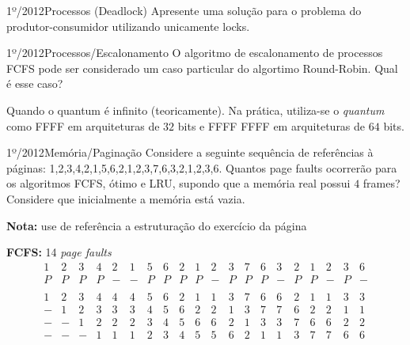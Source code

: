 \begin{exercicio}
  {1º/2012}{Processos (Deadlock)}
  {Apresente uma solução para o problema do produtor-consumidor utilizando unicamente locks.}
\end{exercicio}

\begin{exercicio}
  {1º/2012}{Processos/Escalonamento}
  {O algoritmo de escalonamento de processos FCFS pode ser considerado um caso particular do algortimo Round-Robin. Qual é esse caso?}

  Quando o quantum é infinito (teoricamente). Na prática, utiliza-se o \textit{quantum} como FFFF em arquiteturas de $32$ bits e FFFF FFFF em arquiteturas de $64$ bits.
\end{exercicio}

\begin{exercicio}
  {1º/2012}{Memória/Paginação}
  {Considere a seguinte sequência de referências à páginas:
  1,2,3,4,2,1,5,6,2,1,2,3,7,6,3,2,1,2,3,6. \newline
  Quantos page faults ocorrerão para os algoritmos FCFS, ótimo e LRU, supondo que a memória real possui $4$ frames? Considere que inicialmente a memória está vazia.}

  \textbf{Nota:} use de referência a estruturação do exercício da página \pageref{ex:pagination-1}

  \textbf{FCFS:} 14 \textit{page faults} \\
  \[
  \begin{array}{cccccccccccccccccccc}
1 & 2 & 3 & 4 & 2 & 1 & 5 & 6 & 2 & 1 & 2 & 3 & 7 & 6 & 3 & 2 & 1 & 2 & 3 & 6 \\ \hline
P & P & P & P & - & - & P & P & P & P & - & P & P & P & - & P & P & - & P & - \\
\\
1 & 2 & 3 & 4 & 4 & 4 & 5 & 6 & 2 & 1 & 1 & 3 & 7 & 6 & 6 & 2 & 1 & 1 & 3 & 3 \\
- & 1 & 2 & 3 & 3 & 3 & 4 & 5 & 6 & 2 & 2 & 1 & 3 & 7 & 7 & 6 & 2 & 2 & 1 & 1 \\
- & - & 1 & 2 & 2 & 2 & 3 & 4 & 5 & 6 & 6 & 2 & 1 & 3 & 3 & 7 & 6 & 6 & 2 & 2 \\
- & - & - & 1 & 1 & 1 & 2 & 3 & 4 & 5 & 5 & 6 & 2 & 1 & 1 & 3 & 7 & 7 & 6 & 6 \\
  \end{array}
  \]


\end{exercicio}
